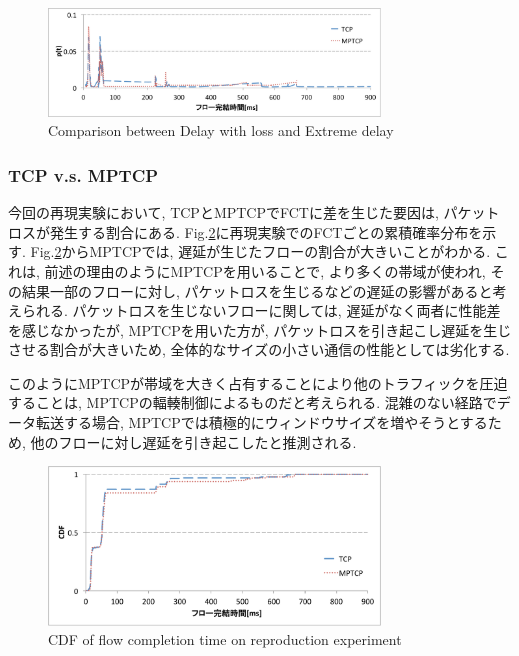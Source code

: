 \begin{figure}[t]
    \begin{center}
    \includegraphics[autoebb, width=250pt]{./img/flow_comp.pdf}
    \caption{Comparison between Delay with loss and Extreme delay}
    \label{fig:delay_loss}
    \end{center}
\end{figure}

\subsubsection{TCP v.s. MPTCP}
今回の再現実験において, TCPとMPTCPでFCTに差を生じた要因は, パケットロスが発生する割合にある.
Fig.\ref{fig:cdf}に再現実験でのFCTごとの累積確率分布を示す.
Fig.\ref{fig:cdf}からMPTCPでは, 遅延が生じたフローの割合が大きいことがわかる. 
これは, 前述の理由のようにMPTCPを用いることで, より多くの帯域が使われ, その結果一部のフローに対し,
パケットロスを生じるなどの遅延の影響があると考えられる. 
パケットロスを生じないフローに関しては, 遅延がなく両者に性能差を感じなかったが, MPTCPを用いた方が,
パケットロスを引き起こし遅延を生じさせる割合が大きいため, 全体的なサイズの小さい通信の性能としては劣化する. 

このようにMPTCPが帯域を大きく占有することにより他のトラフィックを圧迫することは, MPTCPの輻輳制御によるものだと考えられる.
混雑のない経路でデータ転送する場合, MPTCPでは積極的にウィンドウサイズを増やそうとするため, 他のフローに対し遅延を引き起こしたと推測される.


\begin{figure}[t]
    \begin{center}
    \includegraphics[autoebb, width=250pt]{./img/cdf_rep.pdf}
    \caption{CDF of flow completion time on reproduction experiment}
    \label{fig:cdf}
    \end{center}
\end{figure}


